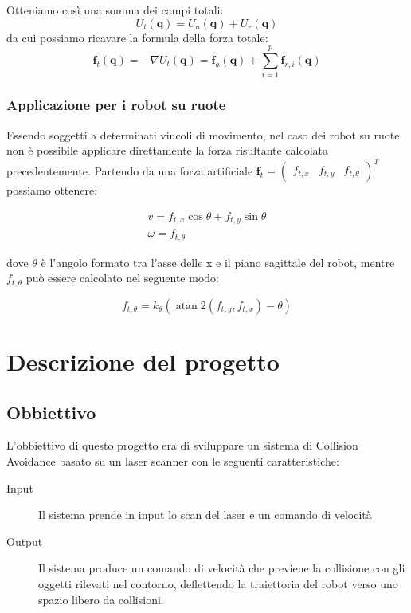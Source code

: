 \documentclass[Lau, binding=0.6cm, oneside]{sapthesis}
\begin{document}
Otteniamo così una somma dei campi totali:
$$
U_{t}(\boldsymbol{q})=U_{a}(\boldsymbol{q})+U_{r}(\boldsymbol{q})
$$
da cui possiamo ricavare la formula della forza totale:
$$
\boldsymbol{f}_{t}(\boldsymbol{q})=-\nabla U_{t}(\boldsymbol{q})=\boldsymbol{f}_{a}(\boldsymbol{q})+\sum_{i=1}^{p} \boldsymbol{f}_{r, i}(\boldsymbol{q})
$$

\subsection{Applicazione per i robot su ruote}
Essendo soggetti a determinati vincoli di movimento, nel caso dei robot su ruote non è possibile applicare direttamente la forza risultante calcolata precedentemente.
Partendo da una forza artificiale $\boldsymbol{f}_{t}=\left(\begin{array}{lll}f_{t, x} & f_{t, y} & f_{t, \theta}\end{array}\right)^{T}$ possiamo ottenere:

$$
\begin{array}{l}
v=f_{t, x} \cos \theta+f_{t, y} \sin \theta \\
\omega=f_{t, \theta}
\end{array}
$$

dove $\theta$ è l'angolo formato tra l'asse delle x e il piano sagittale del robot, mentre $f_{t, \theta}$ può essere calcolato nel seguente modo:

$$
f_{t, \theta}=k_{\theta}\left(\operatorname{atan} 2\left(f_{t, y}, f_{t, x}\right)-\theta\right)
$$

\cite{fonte2}

\chapter{Descrizione del progetto}
\section{Obbiettivo}
L'obbiettivo di questo progetto era di sviluppare un sistema di Collision Avoidance basato su un laser scanner con le seguenti caratteristiche:
\begin{description}
	\item[Input] Il sistema prende in input lo scan del laser e un comando di velocità
	\item[Output] Il sistema produce un comando di velocità che previene la collisione con gli oggetti rilevati nel contorno, deflettendo la traiettoria del robot verso uno spazio libero da collisioni.
\end{description}
\end{document}
